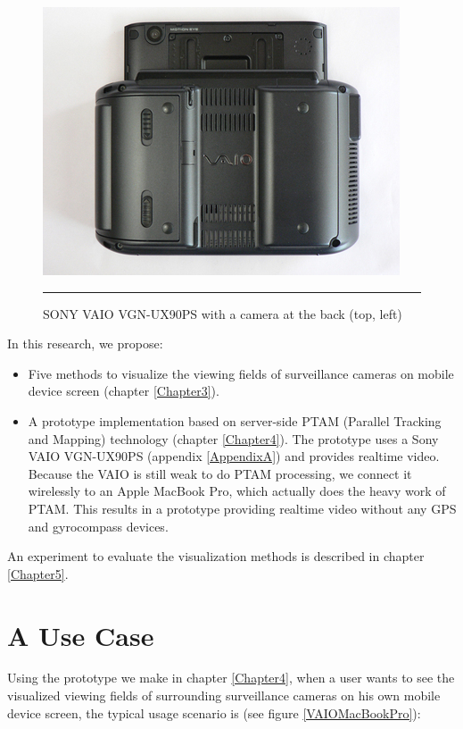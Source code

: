 \begin{figure}[htbp]
	\centering
	\includegraphics{./Primitives/vaio_back.jpg}
	\rule{35em}{0.5pt}
	\caption[SONY VAIO VGN-UX90PS with a camera at the back]{SONY VAIO VGN-UX90PS with a camera at the back (top, left)}
	\label{fig:VAIOBack}
\end{figure}

In this research, we propose:

\begin{itemize}
	\item Five methods to visualize the viewing fields of surveillance cameras on mobile device screen (chapter \ref{Chapter3}).
	\item A prototype implementation based on server-side PTAM (Parallel Tracking and Mapping) \citep{Reference12} technology (chapter \ref{Chapter4}). The prototype uses a Sony VAIO VGN-UX90PS (appendix \ref{AppendixA}) and provides realtime video. Because the VAIO is still weak to do PTAM processing, we connect it wirelessly to an Apple MacBook Pro, which actually does the heavy work of PTAM. This results in a prototype providing realtime video without any GPS and gyrocompass devices.
\end{itemize}

An experiment to evaluate the visualization methods is described in chapter \ref{Chapter5}.


\section{A Use Case}
\label{AUseCase}

Using the prototype we make in chapter \ref{Chapter4}, when a user wants to see the visualized viewing fields of surrounding surveillance cameras on his own mobile device screen, the typical usage scenario is (see figure \ref{VAIOMacBookPro}):

